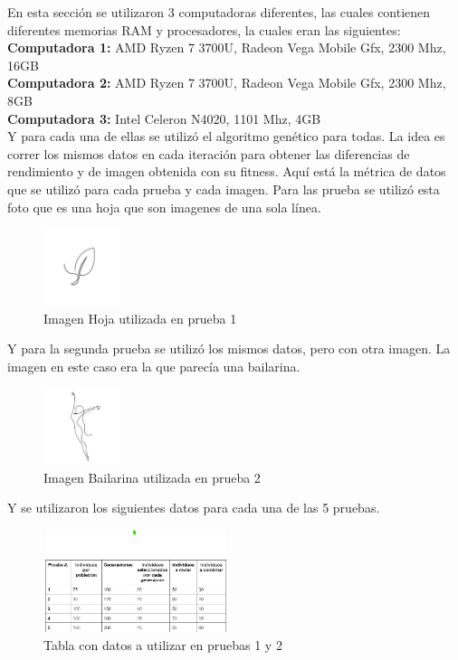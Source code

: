 \documentclass[conference]{IEEEtran}
\begin{document}
En esta sección se utilizaron 3 computadoras diferentes, las cuales contienen diferentes memorias RAM y procesadores, la cuales eran las siguientes: \\

\textbf{Computadora 1:} AMD Ryzen 7 3700U, Radeon Vega Mobile Gfx, 2300 Mhz, 16GB \\
\textbf{Computadora 2:} AMD Ryzen 7 3700U, Radeon Vega Mobile Gfx, 2300 Mhz, 8GB \\
\textbf{Computadora 3:} Intel Celeron N4020, 1101 Mhz, 4GB\\

Y para cada una de ellas se utilizó el algoritmo genético para todas. La idea es correr los mismos datos en cada iteración para obtener las diferencias de rendimiento y de imagen obtenida con su fitness. Aquí está la métrica de datos que se utilizó para cada prueba y cada imagen. 
Para las prueba se utilizó esta foto que es una hoja que son imagenes de una sola línea. 
\begin{figure}[h]
    \centering
    \includegraphics[width=0.2\textwidth]{Hoja.jpg} 
    \caption{Imagen Hoja utilizada en prueba 1}
    \label{fig:mi_imagen}
\end{figure}

Y para la segunda prueba se utilizó los mismos datos, pero con otra imagen. La imagen en este caso era la que parecía una bailarina.
\begin{figure}[h]
    \centering
    \includegraphics[width=0.2\textwidth]{Bailarina.png} 
    \caption{Imagen Bailarina utilizada en prueba 2}
    \label{fig:mi_imagen}
\end{figure}

 Y se utilizaron los siguientes datos para cada una de las 5 pruebas.

\begin{figure}[h]
    \centering
    \includegraphics[width=0.480\textwidth, height=3cm]{tablaDatos.png} 
    \caption{Tabla con datos a utilizar en pruebas 1 y 2}
    \label{fig:mi_imagen}
\end{figure}
\end{document}
